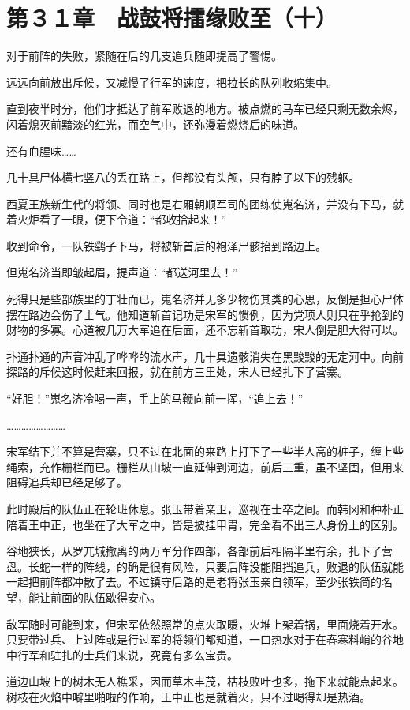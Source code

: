 \section{第３１章　战鼓将擂缘败至（十）}

对于前阵的失败，紧随在后的几支追兵随即提高了警惕。

远远向前放出斥候，又减慢了行军的速度，把拉长的队列收缩集中。

直到夜半时分，他们才抵达了前军败退的地方。被点燃的马车已经只剩无数余烬，闪着熄灭前黯淡的红光，而空气中，还弥漫着燃烧后的味道。

还有血腥味……

几十具尸体横七竖八的丢在路上，但都没有头颅，只有脖子以下的残躯。

西夏王族新生代的将领、同时也是右厢朝顺军司的团练使嵬名济，并没有下马，就着火炬看了一眼，便下令道：“都收拾起来！”

收到命令，一队铁鹞子下马，将被斩首后的袍泽尸骸抬到路边上。

但嵬名济当即皱起眉，提声道：“都送河里去！”

死得只是些部族里的丁壮而已，嵬名济并无多少物伤其类的心思，反倒是担心尸体摆在路边会伤了士气。他知道斩首记功是宋军的惯例，因为党项人则只在乎抢到的财物的多寡。心道被几万大军追在后面，还不忘斩首取功，宋人倒是胆大得可以。

扑通扑通的声音冲乱了哗哗的流水声，几十具遗骸消失在黑黢黢的无定河中。向前探路的斥候这时候赶来回报，就在前方三里处，宋人已经扎下了营寨。

“好胆！”嵬名济冷喝一声，手上的马鞭向前一挥，“追上去！”

……………………

宋军结下并不算是营寨，只不过在北面的来路上打下了一些半人高的桩子，缠上些绳索，充作栅栏而已。栅栏从山坡一直延伸到河边，前后三重，虽不坚固，但用来阻碍追兵却已经足够了。

此时殿后的队伍正在轮班休息。张玉带着亲卫，巡视在士卒之间。而韩冈和种朴正陪着王中正，也坐在了大军之中，皆是披挂甲胄，完全看不出三人身份上的区别。

谷地狭长，从罗兀城撤离的两万军分作四部，各部前后相隔半里有余，扎下了营盘。长蛇一样的阵线，的确是很有风险，只要后阵没能阻挡追兵，败退的队伍就能一起把前阵都冲散了去。不过镇守后路的是老将张玉亲自领军，至少张铁简的名望，能让前面的队伍歇得安心。

敌军随时可能到来，但宋军依然照常的点火取暖，火堆上架着锅，里面烧着开水。只要带过兵、上过阵或是行过军的将领们都知道，一口热水对于在春寒料峭的谷地中行军和驻扎的士兵们来说，究竟有多么宝贵。

道边山坡上的树木无人樵采，因而草木丰茂，枯枝败叶也多，拖下来就能点起来。树枝在火焰中噼里啪啦的作响，王中正也是就着火，只不过喝得却是热酒。

